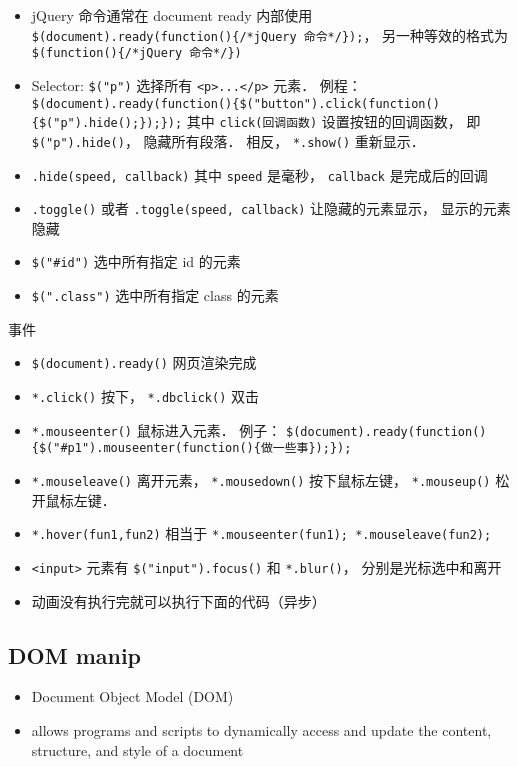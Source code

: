 

\begin{itemize}
\item jQuery 命令通常在 document ready 内部使用 \verb|$(document).ready(function(){/*jQuery 命令*/});|， 另一种等效的格式为 \verb|$(function(){/*jQuery 命令*/})|
\item Selector: \verb|$("p")| 选择所有 \verb|<p>...</p>| 元素． 例程： \verb|$(document).ready(function(){$("button").click(function(){$("p").hide();});});| 其中 \verb|click(回调函数)| 设置按钮的回调函数， 即 \verb|$("p").hide()|， 隐藏所有段落． 相反， \verb|*.show()| 重新显示．
\item \verb|.hide(speed, callback)| 其中 \verb|speed| 是毫秒， \verb|callback| 是完成后的回调
\item \verb|.toggle()| 或者 \verb|.toggle(speed, callback)| 让隐藏的元素显示， 显示的元素隐藏
\item \verb|$("#id")| 选中所有指定 id 的元素
\item \verb|$(".class")| 选中所有指定 class 的元素
\end{itemize}

事件
\begin{itemize}
\item \verb|$(document).ready()| 网页渲染完成
\item \verb|*.click()| 按下， \verb|*.dbclick()| 双击
\item \verb|*.mouseenter()| 鼠标进入元素． 例子： \verb|$(document).ready(function(){$("#p1").mouseenter(function(){做一些事});});|
\item \verb|*.mouseleave()| 离开元素， \verb|*.mousedown()| 按下鼠标左键， \verb|*.mouseup()| 松开鼠标左键．
\item \verb|*.hover(fun1,fun2)| 相当于 \verb|*.mouseenter(fun1); *.mouseleave(fun2);|
\item \verb|<input>| 元素有 \verb|$("input").focus()| 和 \verb|*.blur()|， 分别是光标选中和离开
\item 动画没有执行完就可以执行下面的代码（异步）
\end{itemize}

\subsection{DOM manip}
\begin{itemize}
\item Document Object Model (DOM)
\item allows programs and scripts to dynamically access and update the content, structure, and style of a document
\end{itemize}
